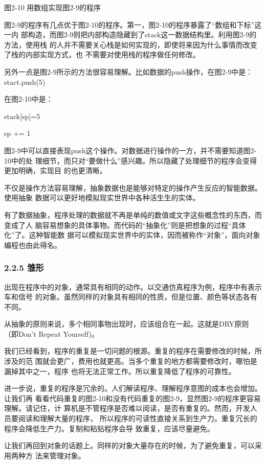 \documentclass[11pt]{ctexart}
\begin{document}
图2-10 用数组实现图2-9的程序 

图2-9的程序有几点优于图2-10的程序。第一，图2-10的程序暴露了“数组和下标”这一内
部构造，而图2-9则把内部构造隐藏到了stack这一数据结构里。利用图2-9的方法，使用栈
的人并不需要关心栈是如何实现的，即使将来因为什么事情而改变了栈的内部实现方式，也
不需要对使用栈的程序做任何修改。

另外一点是图2-9所示的方法很容易理解。比如数据的push操作，在图2-9中是：
stact.push(5)

在图2-10中是：

stack[sp]=5

sp += 1

图2-9中可以直接表现push这个操作。对数据进行操作的一方，并不需要知道图2-10中的处
理细节，而只对“要做什么”感兴趣。所以隐藏了处理细节的程序会变得更加明确，实现目
的也更清晰。

不仅是操作方法容易理解，抽象数据也是能够对特定的操作产生反应的智能数据。使用抽象
数据可以更好地模拟现实世界中各种活生生的实体。

有了数据抽象，程序处理的数据就不再是单纯的数值或文字这些概念性的东西，而变成了人
脑容易想象的具体事物。而代码的“抽象化”则是把想象的过程“具体化”了。这种智能数
据可以模拟现实世界中的实体，因而被称作“对象”，面向对象编程也由此得名。
\subsubsection{2.2.5 雏形}
\label{sec:org38fb4d9}

出现在程序中的对象，通常具有相同的动作。以交通仿真程序为例，程序中有表示车和信号
的对象。虽然同样的对象具有相同的性质，但是位置、颜色等状态各有不同。

从抽象的原则来说，多个相同事物出现时，应该组合在一起。这就是DRY原则（即Don't
Repeat Yourself)。

我们已经看到，程序的重复是一切问题的根源。重复的程序在需要修改的时候，所涉及的范
围就会更广，费用也就更高。当多个重复的地方都需要修改时，哪怕是漏掉其中之一，程序
也将无法正常工作。所以重复降低了程序的可靠性。

进一步说，重复的程序是冗余的。人们解读程序、理解程序意图的成本也会增加。让我们再
看看代码重复的图2-10和没有代码重复的图2-9，显然图2-9的程序更容易理解。请记住，计
算机是不管程序是否难以阅读，是否有重复的。然而，开发人员要阅读和理解大量的程序，
所以程序的可读性直接关系到生产力。重复冗长的程序会降低生产力。复制和粘贴程序会导
致重复，应该尽量避免。

让我们再回到对象的话题上。同样的对象大量存在的时候，为了避免重复，可以采用两种方
法来管理对象。
\end{document}
